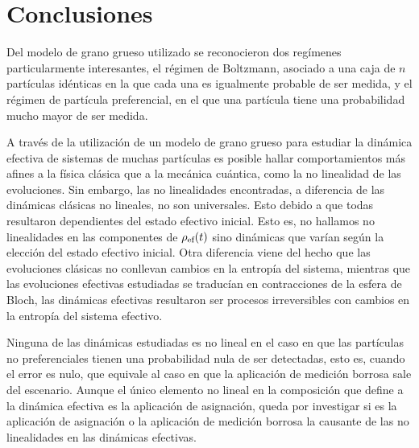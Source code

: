 \chapter{Conclusiones}

Del modelo de grano grueso utilizado se reconocieron dos regímenes particularmente interesantes, el régimen de Boltzmann, asociado a una caja de $n$ partículas idénticas en la que cada una es igualmente probable de ser medida, y el régimen de partícula preferencial, en el que una partícula tiene una probabilidad mucho mayor de ser medida.

A través de la utilización de un modelo de grano grueso para estudiar la dinámica efectiva de sistemas de muchas partículas es posible hallar comportamientos más afines a la física clásica que a la mecánica cuántica, como la no linealidad de las evoluciones. Sin embargo, las no linealidades encontradas, a diferencia de las dinámicas clásicas no lineales, no son universales. Esto debido a que todas resultaron dependientes del estado efectivo inicial. Esto es, no hallamos no linealidades en las componentes de $\rho_{\text{ef}}(t)$ sino dinámicas que varían según la elección del estado efectivo inicial. Otra diferencia viene del hecho que las evoluciones clásicas no conllevan cambios en la entropía del sistema, mientras que las evoluciones efectivas estudiadas se traducían en contracciones de la esfera de Bloch, \ie{} las dinámicas efectivas resultaron ser procesos irreversibles con cambios en la entropía del sistema efectivo.

Ninguna de las dinámicas estudiadas es no lineal en el caso en que las partículas no preferenciales tienen una probabilidad nula de ser detectadas, esto es, cuando el error es nulo, que equivale al caso en que la aplicación de medición borrosa sale del escenario. Aunque el único elemento no lineal en la composición que define a la dinámica efectiva es la aplicación de asignación, queda por investigar si es la aplicación de asignación o la aplicación de medición borrosa la causante de las no linealidades en las dinámicas efectivas.